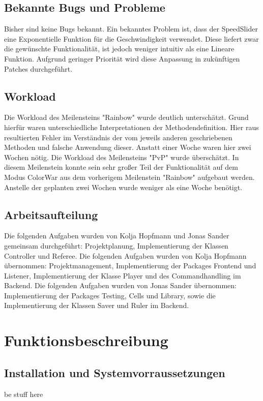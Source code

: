\documentclass[12pt]{article}
\theoremstyle{plain}
\begin{document}
\subsection{Bekannte Bugs und Probleme}
Bisher sind keine Bugs bekannt. Ein bekanntes Problem ist, dass der SpeedSlider eine Exponentielle Funktion für die Geschwindigkeit verwendet. Diese liefert zwar die gewünschte Funktionalität, ist jedoch weniger intuitiv als eine Lineare Funktion. Aufgrund geringer Priorität wird diese Anpassung in zukünftigen Patches durchgeführt.
\subsection{Workload}
Die Workload des Meilensteins "Rainbow" wurde deutlich unterschätzt. Grund hierfür waren unterschiedliche Interpretationen der Methodendefinition. Hier raus resultierten Fehler im Verständnis der vom jeweils anderen geschriebenen Methoden und falsche Anwendung dieser. Anstatt einer Woche waren hier zwei Wochen nötig. Die Workload des Meilensteins "PvP" wurde überschätzt. In diesem Meilenstein konnte sein sehr großer Teil der Funktionalität auf dem Modus ColorWar aus dem vorherigem Meilenstein "Rainbow" aufgebaut werden. Anstelle der geplanten zwei Wochen wurde weniger als eine Woche benötigt.
\subsection{Arbeitsaufteilung}
Die folgenden Aufgaben wurden von Kolja Hopfmann und Jonas Sander gemeinsam durchgeführt: Projektplanung, Implementierung der Klassen Controller und Referee.
Die folgenden Aufgaben wurden von Kolja Hopfmann übernommen: Projektmanagement, Implementierung der Packages Frontend und Listener, Implementierung der Klasse Player und des Commandhandling im Backend.
Die folgenden Aufgaben wurden von Jonas Sander übernommen: Implementierung der Packages Testing, Cells und Library, sowie die Implementierung der Klassen Saver und Ruler im Backend.
\section{Funktionsbeschreibung}
\subsection{Installation und Systemvorraussetzungen}
be stuff here
\newpage
\end{document}
